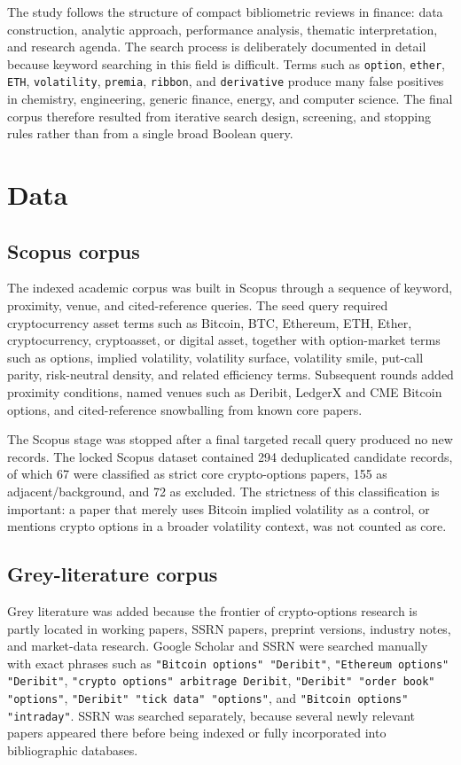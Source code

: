 \documentclass[11pt,a4paper]{article}
\begin{document}
The study follows the structure of compact bibliometric reviews in finance: data construction, analytic approach, performance analysis, thematic interpretation, and research agenda. The search process is deliberately documented in detail because keyword searching in this field is difficult. Terms such as \texttt{option}, \texttt{ether}, \texttt{ETH}, \texttt{volatility}, \texttt{premia}, \texttt{ribbon}, and \texttt{derivative} produce many false positives in chemistry, engineering, generic finance, energy, and computer science. The final corpus therefore resulted from iterative search design, screening, and stopping rules rather than from a single broad Boolean query.

\section{Data}

\subsection{Scopus corpus}

The indexed academic corpus was built in Scopus through a sequence of keyword, proximity, venue, and cited-reference queries. The seed query required cryptocurrency asset terms such as Bitcoin, BTC, Ethereum, ETH, Ether, cryptocurrency, cryptoasset, or digital asset, together with option-market terms such as options, implied volatility, volatility surface, volatility smile, put-call parity, risk-neutral density, and related efficiency terms. Subsequent rounds added proximity conditions, named venues such as Deribit, LedgerX and CME Bitcoin options, and cited-reference snowballing from known core papers.

The Scopus stage was stopped after a final targeted recall query produced no new records. The locked Scopus dataset contained 294 deduplicated candidate records, of which 67 were classified as strict core crypto-options papers, 155 as adjacent/background, and 72 as excluded. The strictness of this classification is important: a paper that merely uses Bitcoin implied volatility as a control, or mentions crypto options in a broader volatility context, was not counted as core.

\subsection{Grey-literature corpus}

Grey literature was added because the frontier of crypto-options research is partly located in working papers, SSRN papers, preprint versions, industry notes, and market-data research. Google Scholar and SSRN were searched manually with exact phrases such as \texttt{"Bitcoin options" "Deribit"}, \texttt{"Ethereum options" "Deribit"}, \texttt{"crypto options" arbitrage Deribit}, \texttt{"Deribit" "order book" "options"}, \texttt{"Deribit" "tick data" "options"}, and \texttt{"Bitcoin options" "intraday"}. SSRN was searched separately, because several newly relevant papers appeared there before being indexed or fully incorporated into bibliographic databases.
\end{document}
